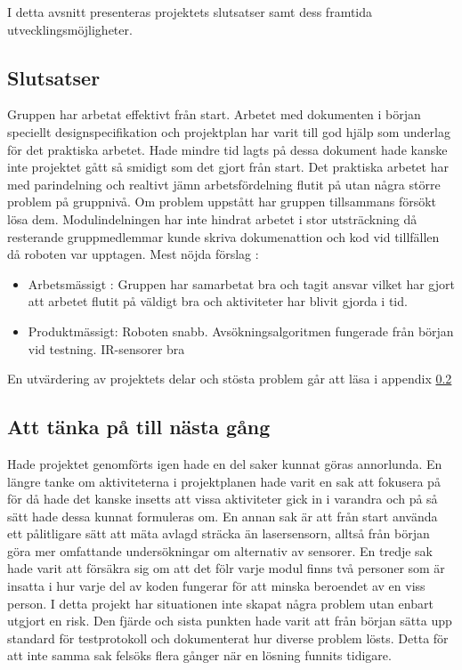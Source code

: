 \documentclass[11pt]{article}
\begin{document}
\begin{flushleft}
I detta avsnitt presenteras projektets slutsatser samt dess framtida utvecklingsmöjligheter.

\subsection{Slutsatser}

Gruppen har arbetat effektivt från start. Arbetet med dokumenten i början speciellt designspecifikation och projektplan har varit till god hjälp som underlag för det praktiska arbetet. Hade mindre tid lagts på dessa dokument hade kanske inte projektet gått så smidigt som det gjort från start. Det praktiska arbetet har med parindelning och realtivt jämn arbetsfördelning flutit på utan några större problem på gruppnivå. Om problem uppstått har gruppen tillsammans försökt lösa dem. Modulindelningen har inte hindrat arbetet i stor utsträckning då resterande gruppmedlemmar kunde skriva dokumenattion och kod vid tillfällen då roboten var upptagen.
Mest nöjda förslag : 
\begin{itemize}
\item Arbetsmässigt : Gruppen har samarbetat bra och tagit ansvar vilket har gjort att arbetet flutit på väldigt bra och aktiviteter har blivit gjorda i tid. 
\item Produktmässigt: Roboten snabb. Avsökningsalgoritmen fungerade från början vid testning. IR-sensorer bra
\end{itemize}

En utvärdering av projektets delar och stösta problem går att läsa i appendix \ref{}

\subsection{Att tänka på till nästa gång}

Hade projektet genomförts igen hade en del saker kunnat göras annorlunda. En längre tanke om aktiviteterna i projektplanen hade varit en sak att fokusera på för då hade det kanske insetts att vissa aktiviteter gick in i varandra och på så sätt hade dessa kunnat formuleras om. En annan sak är att från start använda ett pålitligare sätt att mäta avlagd sträcka än lasersensorn, alltså från början göra mer omfattande undersökningar om alternativ av sensorer. En tredje sak hade varit att försäkra sig om att det fölr varje modul finns två personer som är insatta i hur varje del av koden fungerar för att minska beroendet av en viss person. I detta projekt har situationen inte skapat några problem utan enbart utgjort en risk. Den fjärde och sista punkten hade varit att från början sätta upp standard för testprotokoll och dokumenterat hur diverse problem lösts. Detta för att inte samma sak felsöks flera gånger när en lösning funnits tidigare. 


\end{flushleft}
\end{document}

